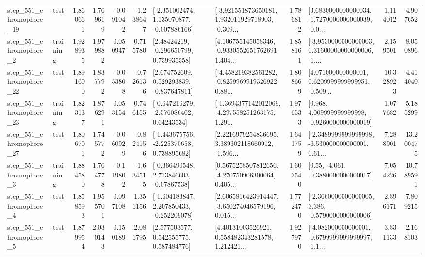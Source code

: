 \begin{tabular}{llrrrrllrlrr}
  step\_551\_chromophore\_19 &      test &      1.860661 &    1.769619 &     -0.091042 & -1.238647 &   [-2.351002474, 1.135070877, -0.007886166] &  [-3.921551873650181, 1.932011929718903, -0.309... &       1.786812 &  [3.6830000000000034, -1.7270000000000039, -0.0... &            1.114012 &          4.907652 \\
   step\_551\_chromophore\_2 &  training &      1.928935 &    1.979882 &      0.050947 &  0.715780 &     [2.48424219, -0.296650799, 0.759935558] &  [4.106755145058346, -0.9330552651762691, 1.404... &       1.858161 &  [-3.9530000000000003, 0.31600000000000006, -1.... &            2.159501 &          8.050896 \\
  step\_551\_chromophore\_22 &      test &      1.891600 &    1.837792 &     -0.053808 & -0.726136 &    [2.674752609, 0.529293839, -0.837647811] &  [-4.458219382561282, -0.8259969919326922, 0.88... &       1.808669 &  [4.071000000000001, 0.6209999999999951, -0.509... &           10.328923 &          4.414040 \\
  step\_551\_chromophore\_23 &  training &      1.823137 &    1.876291 &      0.053154 &  0.746155 &    [-0.647216279, -2.576086402, 0.64243534] &  [-1.3694377142012069, -4.297558251263175, 1.29... &       1.976533 &    [0.968, 4.009999999999998, -0.9260000000000019] &            1.077682 &          5.185299 \\
  step\_551\_chromophore\_27 &      test &      1.806701 &    1.745772 &     -0.060929 & -0.824156 &   [-1.443675756, -2.225370658, 0.738895682] &  [2.2216979254836695, 3.389302118660912, -1.596... &       1.641759 &  [-2.3489999999999998, -3.530000000000001, 0.61... &            7.288901 &         13.200475 \\
   step\_551\_chromophore\_3 &  training &      1.884580 &    1.764778 &     -0.119802 & -1.634515 &    [-0.366490548, 2.713846603, -0.07867538] &  [0.5675258507812656, -4.270750906300064, 0.405... &       1.603540 &                [0.55, -4.061, -0.3880000000000017] &            7.054226 &         10.789591 \\
   step\_551\_chromophore\_4 &      test &      1.858593 &    1.955701 &      0.097108 &  1.351156 &   [-1.604183847, 2.207850433, -0.252209078] &  [2.6065816423914447, -3.650274046579196, 0.015... &       1.772470 &  [-2.3660000000000005, 3.386, -0.5790000000000006] &            2.896171 &          7.809215 \\
   step\_551\_chromophore\_5 &      test &      1.879954 &    2.030143 &      0.150189 &  2.081795 &     [2.577503577, 0.542555775, 0.587484776] &  [4.40131003526921, 0.558482343281578, 1.212421... &       1.927970 &  [-4.082000000000001, -0.6799999999999997, -1.1... &            3.831133 &          2.168103 \\

\end{tabular}
